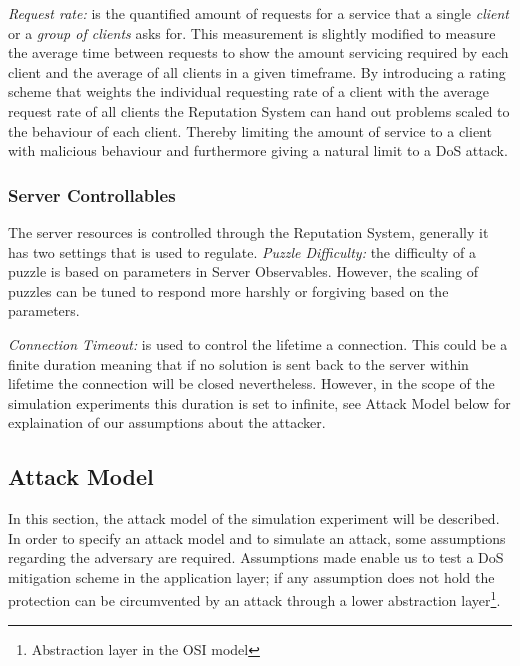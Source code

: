 \emph{Request rate:} is the quantified amount of requests for a service that a single \emph{client} or a \emph{group of clients} asks for. This measurement is slightly modified to measure the average time between requests to show the amount servicing required by each client and the average of all clients in a given timeframe. By introducing a rating scheme that weights the individual requesting rate of a client with the average request rate of all clients the Reputation System can hand out problems scaled to the behaviour of each client. Thereby limiting the amount of service to a client with malicious behaviour and furthermore giving a natural limit to a DoS attack.


\subsubsection{Server Controllables}
The server resources is controlled through the Reputation System, generally it has two settings that is used to regulate.
\emph{Puzzle Difficulty:} the difficulty of a puzzle is based on parameters in Server Observables. However, the scaling of puzzles can be tuned to respond more harshly or forgiving based on the parameters.

\emph{Connection Timeout:} is used to control the lifetime a connection. This could be a finite duration meaning that if no solution is sent back to the server within lifetime the connection will be closed nevertheless.
However, in the scope of the simulation experiments this duration is set to infinite, see Attack Model below for explaination of our assumptions about the attacker. 
\subsection{Attack Model}
In this section, the attack model of the simulation experiment will be described.
In order to specify an attack model and to simulate an attack, some assumptions regarding the adversary are required.
Assumptions made enable us to test a DoS mitigation scheme in the application layer; if any assumption does not hold the protection can be circumvented by an attack through a lower abstraction layer\footnote{Abstraction layer in the OSI model}. 


